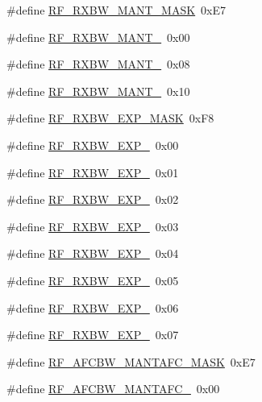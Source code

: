 \begin{DoxyCompactItemize}
\item 
\#define \hyperlink{sx1276Regs-Fsk_8h_acd14c73e628d64f102dbe34390ab20d5}{R\+F\+\_\+\+R\+X\+B\+W\+\_\+\+M\+A\+N\+T\+\_\+\+M\+A\+SK}~0x\+E7
\item 
\#define \hyperlink{sx1276Regs-Fsk_8h_a0e07506869ee3d7bb6e989c67a94f1bc}{R\+F\+\_\+\+R\+X\+B\+W\+\_\+\+M\+A\+N\+T\+\_}~0x00
\item 
\#define \hyperlink{sx1276Regs-Fsk_8h_a3c69e1b355ce895eb1390fc921a27d51}{R\+F\+\_\+\+R\+X\+B\+W\+\_\+\+M\+A\+N\+T\+\_}~0x08
\item 
\#define \hyperlink{sx1276Regs-Fsk_8h_a372ceb3b14593993f8b7f2a25220675b}{R\+F\+\_\+\+R\+X\+B\+W\+\_\+\+M\+A\+N\+T\+\_}~0x10
\item 
\#define \hyperlink{sx1276Regs-Fsk_8h_ab161ca7f3051baf8f6f27a4f177db024}{R\+F\+\_\+\+R\+X\+B\+W\+\_\+\+E\+X\+P\+\_\+\+M\+A\+SK}~0x\+F8
\item 
\#define \hyperlink{sx1276Regs-Fsk_8h_abcc6bb74aa70ef98f9ebe7a145598c69}{R\+F\+\_\+\+R\+X\+B\+W\+\_\+\+E\+X\+P\+\_}~0x00
\item 
\#define \hyperlink{sx1276Regs-Fsk_8h_a96e6aefdfd02d7b9c56bd3cc2ccee993}{R\+F\+\_\+\+R\+X\+B\+W\+\_\+\+E\+X\+P\+\_}~0x01
\item 
\#define \hyperlink{sx1276Regs-Fsk_8h_ac6ae039c9acf780cf56782004f273e1e}{R\+F\+\_\+\+R\+X\+B\+W\+\_\+\+E\+X\+P\+\_}~0x02
\item 
\#define \hyperlink{sx1276Regs-Fsk_8h_a9c4a24cd2f131d5b4222ae0081f90add}{R\+F\+\_\+\+R\+X\+B\+W\+\_\+\+E\+X\+P\+\_}~0x03
\item 
\#define \hyperlink{sx1276Regs-Fsk_8h_a1df24f4f0853faae82bab62e77a81478}{R\+F\+\_\+\+R\+X\+B\+W\+\_\+\+E\+X\+P\+\_}~0x04
\item 
\#define \hyperlink{sx1276Regs-Fsk_8h_a6b7bec394371c0536f76fc58836b2b99}{R\+F\+\_\+\+R\+X\+B\+W\+\_\+\+E\+X\+P\+\_}~0x05
\item 
\#define \hyperlink{sx1276Regs-Fsk_8h_a720c06b4d807792b0a75073b3f826c9f}{R\+F\+\_\+\+R\+X\+B\+W\+\_\+\+E\+X\+P\+\_}~0x06
\item 
\#define \hyperlink{sx1276Regs-Fsk_8h_a600d1cc75c5d6b87ea49e5fdf8d05de2}{R\+F\+\_\+\+R\+X\+B\+W\+\_\+\+E\+X\+P\+\_}~0x07
\item 
\#define \hyperlink{sx1276Regs-Fsk_8h_a7d35ac3bf14ffc3be17ac5450bc781a7}{R\+F\+\_\+\+A\+F\+C\+B\+W\+\_\+\+M\+A\+N\+T\+A\+F\+C\+\_\+\+M\+A\+SK}~0x\+E7
\item 
\#define \hyperlink{sx1276Regs-Fsk_8h_abf43472df1a0e71a5381ab56f212366b}{R\+F\+\_\+\+A\+F\+C\+B\+W\+\_\+\+M\+A\+N\+T\+A\+F\+C\+\_}~0x00

\end{DoxyCompactItemize}
